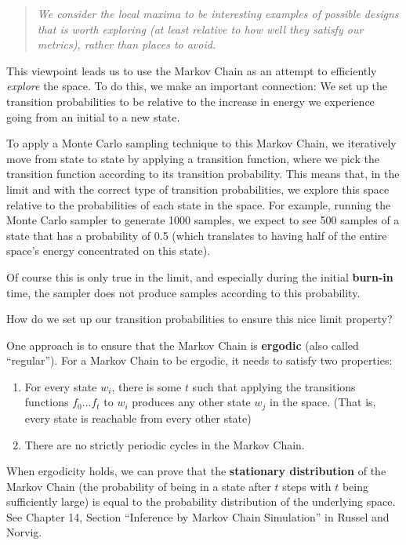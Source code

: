\documentclass[]{article}
\begin{document}
\begin{quote}\textit{We consider the local maxima to be interesting examples of possible designs that is worth exploring (at least relative to how well they satisfy our metrics), rather than places to avoid.}\end{quote}

 This viewpoint leads us to use the Markov Chain as an attempt to efficiently \textit{explore} the space. To do this, we make an important connection: We set up the transition probabilities to be relative to the increase in energy we experience going from an initial to a new state. 

To apply a Monte Carlo sampling technique to this Markov Chain, we iteratively move from state to state by applying a transition function, where we pick the transition function according to its transition probability. This means that, in the limit and with the correct type of transition probabilities, we explore this space relative to the probabilities of each state in the space. For example, running the Monte Carlo sampler to generate 1000 samples, we expect to see 500 samples of a state that has a probability of 0.5 (which translates to having half of the entire space's energy concentrated on this state). 

Of course this is only true in the limit, and especially during the initial \textbf{burn-in} time, the sampler does not produce samples according to this probability. 

How do we set up our transition probabilities to ensure this nice limit property?

One approach is to ensure that the Markov Chain is \textbf{ergodic} (also called ``regular''). For a Markov Chain to be ergodic, it needs to satisfy two properties:
\begin{enumerate}
	\item For every state $w_i$, there is some $t$ such that applying the transitions functions $f_0 ... f_t$ to $w_i$ produces any other state $w_j$ in the space. (That is, every state is reachable from every other state)
	\item There are no strictly periodic cycles in the Markov Chain.
\end{enumerate}

When ergodicity holds, we can prove that the \textbf{stationary distribution} of the Markov Chain (the probability of being in a state after $t$ steps with $t$ being sufficiently large) is equal to the probability distribution of the underlying space. See Chapter 14, Section ``Inference by Markov Chain Simulation'' in Russel and Norvig.\cite{russel-norvig}
\end{document}
